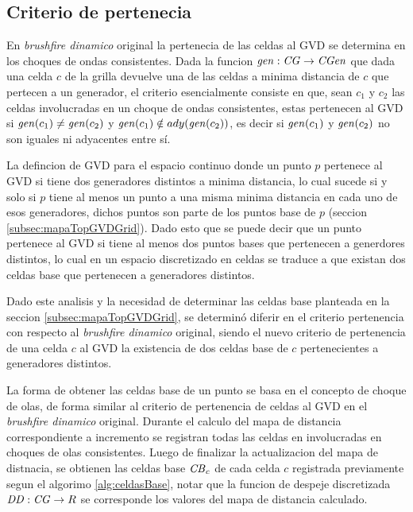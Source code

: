 \subsection{Criterio de pertenecia}\label{subsec:critPer}

En \emph{brushfire dinamico} original la pertenecia de las celdas al GVD se
determina en los choques de ondas consistentes. Dada la funcion $\mathit{gen} :
\mathit{CG} \rightarrow \mathit{CGen}$ que dada una celda $c$ de la grilla devuelve
una de las celdas a minima distancia de $c$ que pertecen a un generador, el
criterio esencialmente consiste en que, sean $c_1$ y $c_2$ las celdas
involucradas en un choque de ondas consistentes, estas pertenecen al GVD si
$\mathit{gen}(c_1) \neq \mathit{gen}(c_2)$ y $\mathit{gen}(c_1) \notin
ady(\mathit{gen}(c_2))$, es decir si $\mathit{gen}(c_1)$ y $\mathit{gen}(c_2)$ no son
iguales ni adyacentes entre sí. 

La defincion de GVD para el espacio continuo donde un punto $p$ pertenece al
GVD si tiene dos generadores distintos a minima distancia, lo cual sucede si y solo si
$p$ tiene al menos un punto a una misma minima distancia en cada uno de esos generadores,
dichos puntos son parte de los puntos base de $p$ (seccion
\ref{subsec:mapaTopGVDGrid}). Dado esto que se puede decir que un punto pertenece
al GVD si tiene al menos dos puntos bases que pertenecen a generdores
distintos, lo cual en un espacio discretizado en celdas se traduce a que
existan dos celdas base que pertenecen a generadores distintos.

Dado este analisis y la necesidad de determinar las celdas base planteada en la
seccion \ref{subsec:mapaTopGVDGrid}, se determinó diferir en el criterio
pertenencia con respecto al \emph{brushfire dinamico} original, siendo el nuevo
criterio de pertenencia de una celda $c$ al GVD la existencia de dos celdas
base de $c$ pertenecientes a generadores distintos.

La forma de obtener las celdas base de un punto se basa en el concepto de
choque de olas, de forma similar al criterio de pertenencia de celdas al GVD en
el \emph{brushfire dinamico} original. Durante el calculo del mapa de distancia
correspondiente a incremento se registran todas las celdas en involucradas en
choques de olas consistentes. Luego de finalizar la actualizacion del mapa de
distnacia, se obtienen las celdas base $\mathit{CB}_c$ de cada celda $c$
registrada previamente segun el algorimo \ref{alg:celdasBase}, notar que la
funcion de despeje discretizada $\mathit{DD} : \mathit{CG} \rightarrow R$ se
corresponde los valores del mapa de distancia calculado.

